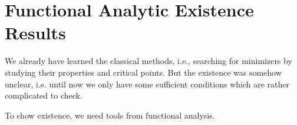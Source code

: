 \chapter{Functional Analytic Existence Results}
\label{ch:convexcase}
We already have learned the classical methods, i.e., 
searching for minimizers by studying their properties and critical points.
But the existence was somehow unclear, i.e. until now we only have some
sufficient conditions which are rather complicated to check.

To show existence, we need tools from functional analysis.